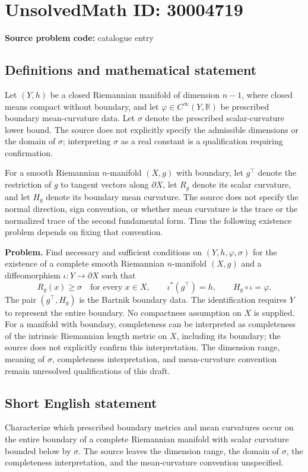 \documentclass[11pt]{article}
\newcommand{\R}{\mathbb{R}}
\begin{document}
\section*{UnsolvedMath ID: 30004719}
\textbf{Source problem code:} catalogue entry
\subsection{Definitions and mathematical statement}
Let $(Y,h)$ be a closed Riemannian manifold of dimension $n-1$, where closed means compact without boundary, and let $\varphi\in C^\infty(Y,\R)$ be prescribed boundary mean-curvature data. Let $\sigma$ denote the prescribed scalar-curvature lower bound. The source does not explicitly specify the admissible dimensions or the domain of $\sigma$; interpreting $\sigma$ as a real constant is a qualification requiring confirmation.

For a smooth Riemannian $n$-manifold $(X,g)$ with boundary, let $g^\top$ denote the restriction of $g$ to tangent vectors along $\partial X$, let $R_g$ denote its scalar curvature, and let $H_g$ denote its boundary mean curvature. The source does not specify the normal direction, sign convention, or whether mean curvature is the trace or the normalized trace of the second fundamental form. Thus the following existence problem depends on fixing that convention.

\textbf{Problem.} Find necessary and sufficient conditions on $(Y,h,\varphi,\sigma)$ for the existence of a complete smooth Riemannian $n$-manifold $(X,g)$ and a diffeomorphism $\iota:Y\longrightarrow\partial X$ such that
\[
R_g(x)\geq\sigma\quad\text{for every }x\in X,
\qquad
\iota^*(g^\top)=h,
\qquad
H_g\circ\iota=\varphi.
\]
The pair $(g^\top,H_g)$ is the Bartnik boundary data. The identification requires $Y$ to represent the entire boundary. No compactness assumption on $X$ is supplied. For a manifold with boundary, completeness can be interpreted as completeness of the intrinsic Riemannian length metric on $X$, including its boundary; the source does not explicitly confirm this interpretation. The dimension range, meaning of $\sigma$, completeness interpretation, and mean-curvature convention remain unresolved qualifications of this draft.
\subsection{Short English statement}
Characterize which prescribed boundary metrics and mean curvatures occur on the entire boundary of a complete Riemannian manifold with scalar curvature bounded below by $\sigma$. The source leaves the dimension range, the domain of $\sigma$, the completeness interpretation, and the mean-curvature convention unspecified.
\end{document}
